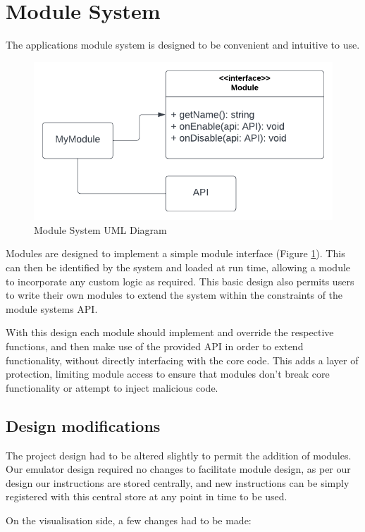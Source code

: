 \section{Module System}
The applications module system is designed to be convenient and intuitive to use.

\begin{figure}[H]
    \centering
    \includegraphics[width=0.9\linewidth]{dissertation/DATA/module uml.png}
    \caption{Module System UML Diagram}
    \label{fig:module_uml}
\end{figure}

Modules are designed to implement a simple module interface (Figure \ref{fig:module_uml}). This can then be identified by the system and loaded at run time, allowing a module to incorporate any custom logic as required. This basic design also permits users to write their own modules to extend the system within the constraints of the module systems API.

With this design each module should implement and override the respective functions, and then make use of the provided API in order to extend functionality, without directly interfacing with the core code. This adds a layer of protection, limiting module access to ensure that modules don't break core functionality or attempt to inject malicious code.

\subsection{Design modifications}
The project design had to be altered slightly to permit the addition of modules. Our emulator design required no changes to facilitate module design, as per our design our instructions are stored centrally, and new instructions can be simply registered with this central store at any point in time to be used.

On the visualisation side, a few changes had to be made:

